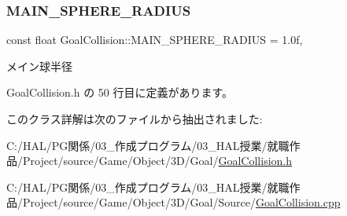 \subsubsection{\texorpdfstring{M\+A\+I\+N\+\_\+\+S\+P\+H\+E\+R\+E\+\_\+\+R\+A\+D\+I\+US}{MAIN\_SPHERE\_RADIUS}}
{\footnotesize\ttfamily const float Goal\+Collision\+::\+M\+A\+I\+N\+\_\+\+S\+P\+H\+E\+R\+E\+\_\+\+R\+A\+D\+I\+US = 1.\+0f\hspace{0.3cm}{\ttfamily [static]}, {\ttfamily [private]}}



メイン球半径 



 Goal\+Collision.\+h の 50 行目に定義があります。



このクラス詳解は次のファイルから抽出されました\+:\begin{DoxyCompactItemize}
\item 
C\+:/\+H\+A\+L/\+P\+G関係/03\+\_\+作成プログラム/03\+\_\+\+H\+A\+L授業/就職作品/\+Project/source/\+Game/\+Object/3\+D/\+Goal/\mbox{\hyperlink{_goal_collision_8h}{Goal\+Collision.\+h}}\item 
C\+:/\+H\+A\+L/\+P\+G関係/03\+\_\+作成プログラム/03\+\_\+\+H\+A\+L授業/就職作品/\+Project/source/\+Game/\+Object/3\+D/\+Goal/\+Source/\mbox{\hyperlink{_goal_collision_8cpp}{Goal\+Collision.\+cpp}}\end{DoxyCompactItemize}
